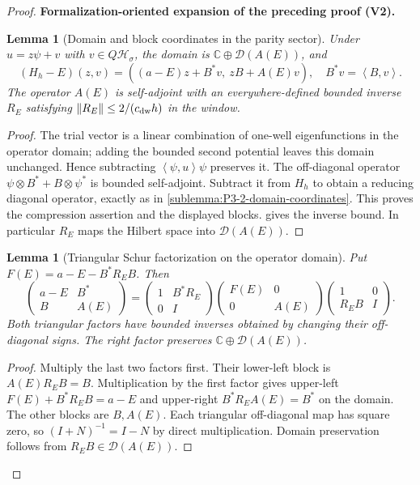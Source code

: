 \documentclass[11pt]{article}
\newtheorem{lemma}[theorem]{Lemma}
\newcommand{\formalisationparentid}{X}
\newenvironment{formalisationaddition}[1]{\par\medskip\begingroup\color{blue}\def\formalisationparentid{#1}\setcounter{formalizationsublemma}{0}\let\lemma\formalizationsublemma\let\endlemma\endformalizationsublemma
  \def\Eo{\mathcal E_h^\circ}\def\EE{\mathcal E_h}\def\phio{\phi_h^\circ}\def\phih{\phi_h}\def\Ho{H_h^{\rm atom}(v^\circ)}\def\Ha{H_h^{\rm atom}}\def\HL{H_h^{L}}\def\Dh{D_h}\def\Log{\operatorname{Log}}\def\ellh{\ell_h}\def\Gp{G_{p,h}}\def\Ast{A_{*,h}}\def\ahat{\widehat{\mathfrak a}_h}\def\ah{\mathfrak a_h}\def\rh{\widehat\rho_h}\def\deltah{\widehat\delta_h}\def\oldref##1{\textup{(##1)}}\def\interface##1{\par\noindent\textit{Analytical interface used here.} ##1\par}\def\finish{\par\noindent\textit{Conclusion of the formalization-oriented expansion.} }\par\noindent\textbf{Formalization-oriented expansion of the preceding proof (V2).}\par\smallskip
}{\par\endgroup\medskip
}
\newcommand{\R}{\mathbb R}
\newcommand{\C}{\mathbb C}
\newcommand{\ip}[2]{\left\langle #1,#2\right\rangle}
\begin{document}
\begin{proof}
\begin{formalisationaddition}{T4.7}
\begin{lemma}[Domain and block coordinates in the parity sector]\label{sublemma:T4-7-block-domain}
Under $u=z\psi+v$ with $v\in Q\mathcal H_\sigma$, the domain is
$\C\oplus\mathcal D(A(E))$, and
\[
 (H_h-E)(z,v)=((a-E)z+B^*v,\ zB+A(E)v),\quad B^*v=\ip Bv.
\]
The operator $A(E)$ is self-adjoint with an everywhere-defined bounded
inverse $R_E$ satisfying $\|R_E\|\le2/(c_{\rm dw}h)$ in the window.
\end{lemma}
\begin{proof}
The trial vector is a linear combination of one-well eigenfunctions in
the operator domain; adding the bounded second potential leaves this
domain unchanged. Hence subtracting $\ip\psi u\psi$ preserves it.
The off-diagonal operator $\psi\otimes B^*+B\otimes\psi^*$ is bounded
self-adjoint. Subtract it from $H_h$ to obtain a reducing diagonal
operator, exactly as in \ref{sublemma:P3-2-domain-coordinates}.
This proves the compression assertion and the displayed blocks.
 gives the inverse bound. In
particular $R_E$ maps the Hilbert space into $\mathcal D(A(E))$.
\end{proof}

\begin{lemma}[Triangular Schur factorization on the operator domain]\label{sublemma:T4-7-triangular}
Put $F(E)=a-E-B^*R_EB$. Then
\[
 \begin{pmatrix}a-E&B^*\\B&A(E)\end{pmatrix}
 =\begin{pmatrix}1&B^*R_E\\0&I\end{pmatrix}
  \begin{pmatrix}F(E)&0\\0&A(E)\end{pmatrix}
  \begin{pmatrix}1&0\\R_EB&I\end{pmatrix}.
\]
Both triangular factors have bounded inverses obtained by changing their
off-diagonal signs. The right factor preserves $\C\oplus\mathcal D(A(E))$.
\end{lemma}
\begin{proof}
Multiply the last two factors first. Their lower-left block is
$A(E)R_EB=B$. Multiplication by the first factor gives upper-left
$F(E)+B^*R_EB=a-E$ and upper-right $B^*R_EA(E)=B^*$ on the domain.
The other blocks are $B,A(E)$. Each triangular off-diagonal map has
square zero, so $(I+N)^{-1}=I-N$ by direct multiplication.
Domain preservation follows from $R_EB\in\mathcal D(A(E))$.
\end{proof}


\end{formalisationaddition}
\end{proof}
\end{document}
